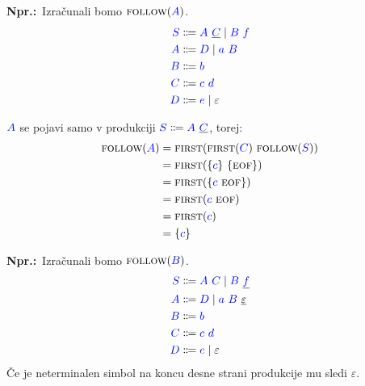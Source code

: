 \documentclass{article}
\newcommand{\Ex}{\textbf{Npr.:}\ }
\newcommand{\FIRST}{\textsc{first}}
\newcommand{\FOLLOW}{\textsc{follow}}
\newcommand{\EOF}{\textsc{eof}}
\newcommand{\Symbol}[1]{\textcolor{blue}{#1}}
\newcommand{\Null}{\varepsilon}
\newcommand{\Arrow}{\Coloneq}
\newcommand{\Seq}{\ }
\newcommand{\Union}{\mathrel{|}}
\begin{document}
\Ex Izračunali bomo $\FOLLOW(\Symbol{A})$.
\begin{equation*}
  \begin{aligned}
    \Symbol{S} &\Arrow \Symbol{A} \Seq \underline{\Symbol{C}} \Union \Symbol{B} \Seq \Symbol{f} \\
    \Symbol{A} &\Arrow \Symbol{D} \Union \Symbol{a} \Seq \Symbol{B} \\
    \Symbol{B} &\Arrow \Symbol{b}\\
    \Symbol{C} &\Arrow \Symbol{c} \Seq \Symbol{d}\\
    \Symbol{D} &\Arrow \Symbol{e} \Union \Null
  \end{aligned}
\end{equation*}

$\Symbol{A}$ se pojavi samo v produkciji $\Symbol{S} \Arrow \Symbol{A} \Seq \underline{\Symbol{C}}$, torej:
\begin{align*}
  \FOLLOW(\Symbol{A}) &= \FIRST(\FIRST(\Symbol{C}) \Seq \FOLLOW(\Symbol{S})) \\
             &= \FIRST(\{\Symbol{c}\} \Seq \{\EOF\})\\
             &= \FIRST(\{\Symbol{c} \Seq \EOF\})\\
             &= \FIRST(\Symbol{c} \Seq \EOF) \\
             &= \FIRST(\Symbol{c}) \\
             &= \{\Symbol{c}\}
\end{align*}

\Ex Izračunali bomo $\FOLLOW(\Symbol{B})$.
\begin{equation*}
  \begin{aligned}
    \Symbol{S} &\Arrow \Symbol{A} \Seq \Symbol{C} \Union \Symbol{B} \Seq \underline{\Symbol{f}} \\
    \Symbol{A} &\Arrow \Symbol{D} \Union \Symbol{a} \Seq \Symbol{B} \Seq \underline{\Null} \\
    \Symbol{B} &\Arrow \Symbol{b}\\
    \Symbol{C} &\Arrow \Symbol{c} \Seq \Symbol{d}\\
    \Symbol{D} &\Arrow \Symbol{e} \Union \Null
  \end{aligned}
\end{equation*}
Če je neterminalen simbol na koncu desne strani produkcije mu sledi $\Null$.
\end{document}
